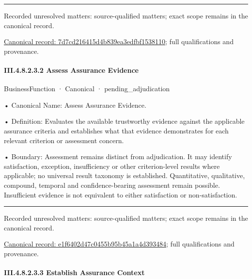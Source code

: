 \medskip\hrule\medskip

{\small Recorded unresolved matters: source-qualified matters; exact scope remains in the canonical record.}\par
{\footnotesize \href{../../../../continuum/business/business-function/7d7cd216415d4b839ea3edfbf1538110.md}{Canonical record: 7d7cd216415d4b839ea3edfbf1538110}; full qualifications and provenance.}\par
\paragraph*{III.4.8.2.3.2 Assess Assurance Evidence}
\label{navigation:III.4.8.2.3.2}

\label{element:e1f6402d47c0455b95b45a1a4d393484}
{\small BusinessFunction · Canonical · pending\_adjudication}\par

•
Canonical Name: Assess Assurance Evidence.



•
Definition: Evaluates the available trustworthy evidence against the applicable assurance criteria and establishes what that evidence demonstrates for each relevant criterion or assessment concern.



•
Boundary: Assessment remains distinct from adjudication. It may identify satisfaction, exception, insufficiency or other criterion-level results where applicable; no universal result taxonomy is established. Quantitative, qualitative, compound, temporal and confidence-bearing assessment remain possible. Insufficient evidence is not equivalent to either satisfaction or non-satisfaction.



\medskip\hrule\medskip

{\small Recorded unresolved matters: source-qualified matters; exact scope remains in the canonical record.}\par
{\footnotesize \href{../../../../continuum/business/business-function/e1f6402d47c0455b95b45a1a4d393484.md}{Canonical record: e1f6402d47c0455b95b45a1a4d393484}; full qualifications and provenance.}\par
\paragraph*{III.4.8.2.3.3 Establish Assurance Context}
\label{navigation:III.4.8.2.3.3}


